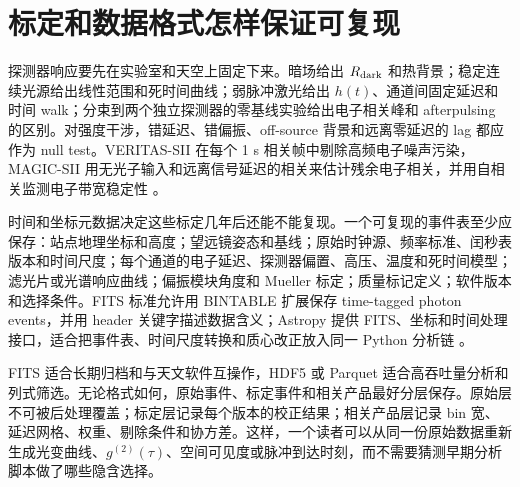 \section{标定和数据格式怎样保证可复现}

探测器响应要先在实验室和天空上固定下来。暗场给出 \(R_{\rm dark}\) 和热背景；稳定连续光源给出线性范围和死时间曲线；弱脉冲激光给出 \(h(t)\)、通道间固定延迟和时间 walk；分束到两个独立探测器的零基线实验给出电子相关峰和 afterpulsing 的区别。对强度干涉，错延迟、错偏振、off-source 背景和远离零延迟的 lag 都应作为 null test。VERITAS-SII 在每个 1 s 相关帧中剔除高频电子噪声污染，MAGIC-SII 用无光子输入和远离信号延迟的相关来估计残余电子相关，并用自相关监测电子带宽稳定性 \citep{2020NatAs...4.1164A,2024MNRAS.529.4387A}。

时间和坐标元数据决定这些标定几年后还能不能复现。一个可复现的事件表至少应保存：站点地理坐标和高度；望远镜姿态和基线；原始时钟源、频率标准、闰秒表版本和时间尺度；每个通道的电子延迟、探测器偏置、高压、温度和死时间模型；滤光片或光谱响应曲线；偏振模块角度和 Mueller 标定；质量标记定义；软件版本和选择条件。FITS 标准允许用 BINTABLE 扩展保存 time-tagged photon events，并用 header 关键字描述数据含义；Astropy 提供 FITS、坐标和时间处理接口，适合把事件表、时间尺度转换和质心改正放入同一 Python 分析链 \citep{2010A&A...524A..42P,2013A&A...558A..33A,2018AJ....156..123A}。

FITS 适合长期归档和与天文软件互操作，HDF5 或 Parquet 适合高吞吐量分析和列式筛选。无论格式如何，原始事件、标定事件和相关产品最好分层保存。原始层不可被后处理覆盖；标定层记录每个版本的校正结果；相关产品层记录 bin 宽、延迟网格、权重、剔除条件和协方差。这样，一个读者可以从同一份原始数据重新生成光变曲线、\(g^{(2)}(\tau)\)、空间可见度或脉冲到达时刻，而不需要猜测早期分析脚本做了哪些隐含选择。

